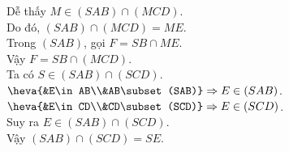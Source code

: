 \begin{ex}
{\begin{itemchoice}
    Dễ thấy $M\in (SAB)\cap (MCD)$.\\
   Do đó, $(SAB)\cap (MCD)=ME$.\\ 
   Trong $(SAB)$, gọi $F=SB\cap ME$.\\ 
   Vậy  $F=SB\cap (MCD)$.
   \\ 
   Ta có $S\in (SAB)\cap  (SCD)$.\\
   $\heva{&E\in AB\\&AB\subset  (SAB)}\Rightarrow E\in (SAB)$.\\
    $\heva{&E\in CD\\&CD\subset (SCD)}\Rightarrow E\in (SCD)$.\\
   Suy  ra $E\in (SAB)\cap (SCD)$.\\
    Vậy $(SAB)\cap (SCD)=SE$.
  \end{itemchoice}
 } 
\end{ex}

